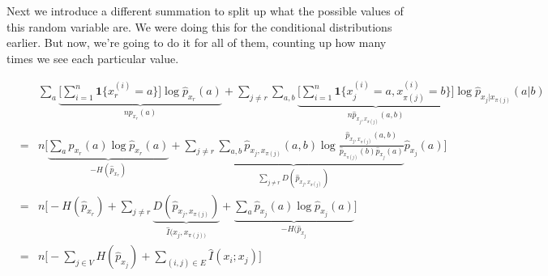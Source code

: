 Next we introduce a different summation to split up what the possible values of this random variable are. We were doing this for the conditional distributions earlier. But now, we're going to do it for all of them, counting up how many times we see each particular value. %

\begin{eqnarray*}
& & \sum_a \underbrace{\bigg[ \sum_{i=1}^n \mathbf{1} \{ x_r^{(i)} = a\} \bigg] \log \widehat{p}_{x_r} (a)}_{n p_{x_r} (a)} + \sum_{j \ne r} \sum_{a,b} \underbrace{\bigg[ \sum_{i=1}^n \mathbf{1} \{ x_j^{(i)} = a, x_{\pi(j)}^{(i)} = b \} \bigg]}_{n \widehat{p}_{x_j, x_{\pi(j)}} (a,b) } \log \widehat{p}_{x_j | x_{\pi(j)}} (a|b) \\
&=& n \bigg[ \underbrace{\sum_a p_{x_r} (a) \log \widehat{p}_{x_r} (a)}_{-H(\widehat{p}_{x_r})} + \underbrace{\sum_{j \ne r} \sum_{a,b} \widehat{p}_{x_j, x_{\pi(j)}} (a,b) \log \frac{ \widehat{p}_{x_j, x_{\pi(j)}} (a,b) }{ \widehat{p}_{x_{\pi(j)}} (b) \widehat{p}_{x_j}(a)} }_{\sum_{j \ne r} D(\widehat{p}_{x_j, x_{\pi(j)}})} \widehat{p}_{x_j}(a) \bigg] \\
&=& n \bigg[ -H(\widehat{p}_{x_r}) + \sum_{j \ne r} \underbrace{D(\widehat{p}_{x_j, x_{\pi(j)}})}_{\widehat{I}(x_j, x_{\pi(j))}} + \underbrace{\sum_a \widehat{p}_{x_j}(a) \log \widehat{p}_{x_j}(a)}_{-H(\widehat{p}_{x_j}} \bigg] \\
&=& n \bigg[ -\sum_{j \in V} H(\widehat{p}_{x_j}) + \sum_{(i,j) \in E} \widehat{I}(x_i;x_j) \bigg]
\end{eqnarray*}

